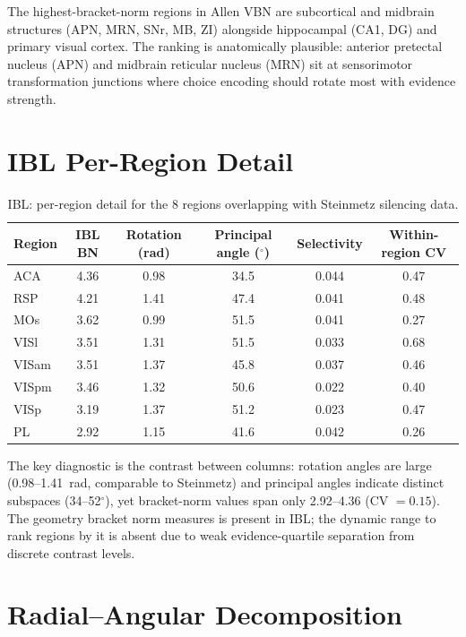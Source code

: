 \documentclass[9pt,lineno]{elife}
\begin{document}
The highest-bracket-norm regions in Allen VBN are subcortical and midbrain structures (APN, MRN, SNr, MB, ZI) alongside hippocampal (CA1, DG) and primary visual cortex. The ranking is anatomically plausible: anterior pretectal nucleus (APN) and midbrain reticular nucleus (MRN) sit at sensorimotor transformation junctions where choice encoding should rotate most with evidence strength.

\section{IBL Per-Region Detail}
\label{app:ibl}

\begin{table}[h]
\centering
\caption{IBL: per-region detail for the 8 regions overlapping with Steinmetz silencing data.}
\label{tab:ibl_detail}
\small
\begin{tabular}{lccccc}
\toprule
Region & IBL BN & Rotation (rad) & Principal angle ($^\circ$) & Selectivity & Within-region CV \\
\midrule
ACA & 4.36 & 0.98 & 34.5 & 0.044 & 0.47 \\
RSP & 4.21 & 1.41 & 47.4 & 0.041 & 0.48 \\
MOs & 3.62 & 0.99 & 51.5 & 0.041 & 0.27 \\
VISl & 3.51 & 1.31 & 51.5 & 0.033 & 0.68 \\
VISam & 3.51 & 1.37 & 45.8 & 0.037 & 0.46 \\
VISpm & 3.46 & 1.32 & 50.6 & 0.022 & 0.40 \\
VISp & 3.19 & 1.37 & 51.2 & 0.023 & 0.47 \\
PL & 2.92 & 1.15 & 41.6 & 0.042 & 0.26 \\
\bottomrule
\end{tabular}
\end{table}

The key diagnostic is the contrast between columns: rotation angles are large (0.98--1.41~rad, comparable to Steinmetz) and principal angles indicate distinct subspaces (34--52$^\circ$), yet bracket-norm values span only 2.92--4.36 (CV $= 0.15$). The geometry bracket norm measures is present in IBL; the dynamic range to rank regions by it is absent due to weak evidence-quartile separation from discrete contrast levels.

\section{Radial--Angular Decomposition}
\label{app:decomposition}
\end{document}
